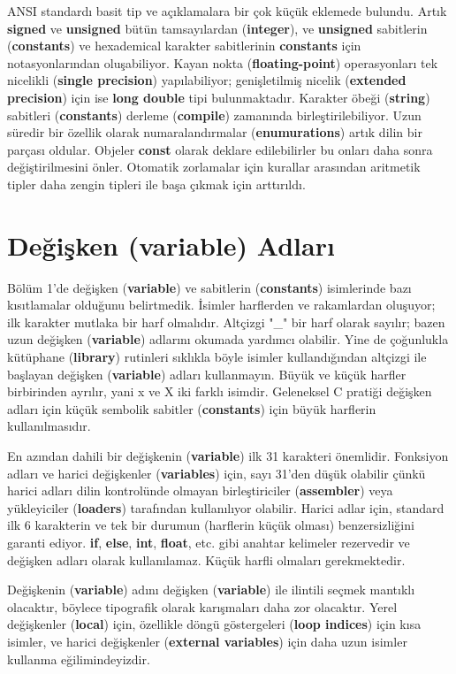 \documentclass[a4paper,12pt,oneside]{book}
\begin{document}
\par ANSI standardı basit tip ve açıklamalara bir çok küçük eklemede bulundu. Artık \textbf{signed} ve \textbf{unsigned} bütün tamsayılardan (\textbf{integer}), ve \textbf{unsigned} sabitlerin (\textbf{constants}) ve hexademical karakter sabitlerinin \textbf{constants} için notasyonlarından oluşabiliyor. Kayan nokta (\textbf{floating-point}) operasyonları tek nicelikli (\textbf{single precision}) yapılabiliyor; genişletilmiş nicelik (\textbf{extended precision}) için ise \textbf{long double} tipi bulunmaktadır. Karakter öbeği (\textbf{string}) sabitleri (\textbf{constants}) derleme (\textbf{compile}) zamanında birleştirilebiliyor. Uzun süredir bir özellik olarak numaralandırmalar (\textbf{enumurations}) artık dilin bir parçası oldular. Objeler \textbf{const} olarak deklare edilebilirler bu onları daha sonra değiştirilmesini önler. Otomatik zorlamalar için kurallar arasından aritmetik tipler daha zengin tipleri ile başa çıkmak için arttırıldı. \\

\section{Değişken (\textbf{variable}) Adları}

Bölüm 1'de değişken (\textbf{variable}) ve sabitlerin (\textbf{constants}) isimlerinde bazı kısıtlamalar olduğunu belirtmedik. İsimler harflerden ve rakamlardan oluşuyor; ilk karakter mutlaka bir harf olmalıdır. Altçizgi "\_" bir harf olarak sayılır; bazen uzun değişken (\textbf{variable}) adlarını okumada yardımcı olabilir. Yine de çoğunlukla kütüphane (\textbf{library}) rutinleri sıklıkla böyle isimler kullandığından altçizgi ile başlayan değişken (\textbf{variable}) adları kullanmayın. Büyük ve küçük harfler birbirinden ayrılır, yani x ve X iki farklı isimdir. Geleneksel C pratiği değişken adları için küçük sembolik sabitler (\textbf{constants}) için büyük harflerin kullanılmasıdır.
\par En azından dahili bir değişkenin (\textbf{variable}) ilk 31 karakteri önemlidir. Fonksiyon adları ve harici değişkenler (\textbf{variables}) için, sayı 31'den düşük olabilir çünkü harici adları dilin kontrolünde olmayan birleştiriciler (\textbf{assembler}) veya yükleyiciler (\textbf{loaders}) tarafından kullanılıyor olabilir. Harici adlar için, standard ilk 6 karakterin ve tek bir durumun (harflerin küçük olması) benzersizliğini garanti ediyor. \textbf{if}, \textbf{else}, \textbf{int}, \textbf{float}, etc. gibi anahtar kelimeler rezervedir ve değişken adları olarak kullanılamaz. Küçük harfli olmaları gerekmektedir.
\par Değişkenin (\textbf{variable}) adını değişken (\textbf{variable}) ile ilintili seçmek mantıklı olacaktır, böylece tipografik olarak karışmaları daha zor olacaktır. Yerel değişkenler (\textbf{local}) için, özellikle döngü göstergeleri (\textbf{loop indices}) için kısa isimler, ve harici değişkenler (\textbf{external variables}) için daha uzun isimler kullanma eğilimindeyizdir. \\
\end{document}
